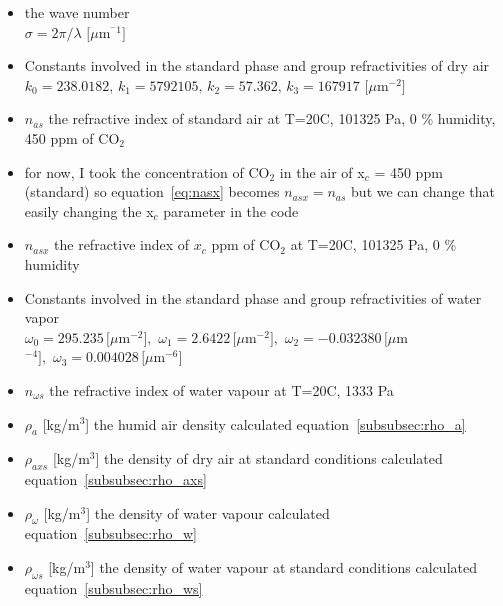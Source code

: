 \begin{itemize}
	\item the wave number\\ $\sigma  = 2\pi/\lambda\,\,[\mu $m$^{^-1}]$
	\item Constants involved in the standard phase and group refractivities of dry air \cite{Ciddor}\\ $k_0 = 238.0182,\,k_1 = 5792105,\,k_2 = 57.362,\,k_3 = 167917\,\,[\mu $m$^{-2}]$ 
	\item $n_{as}$ the refractive index of standard air at T=20\degree C, 101325 Pa, 0 \% humidity, 450 ppm of CO$_2$
	\item for now, I took the concentration of CO$_2$ in the air of x$_c$ = 450 ppm (standard) so equation~\eqref{eq:nasx} becomes $n_{asx} = n_{as}$ but we can change that easily changing the x$_c$ parameter in the code
	\item $n_{asx}$ the refractive index of $x_c$ ppm of CO$_2$ at T=20\degree C, 101325 Pa, 0 \% humidity
	\item Constants involved in the standard phase and group refractivities of water vapor\cite{Ciddor}\\ $\omega_0 = 295.235\,[\mu $m$^{-2}],\,\,\omega_1 = 2.6422\,[\mu $m$^{-2}],\,\,\omega_2 = -0.032380\,[\mu $m$^{-4}],\,\,\omega_3 = 0.004028\,[\mu$m$^{-6}]$
	\item $n_{\omega s}$ the refractive index of water vapour at T=20\degree C, 1333 Pa
	\item $\rho_a$ [kg/m$^3$] the humid air density calculated equation~\eqref{subsubsec:rho_a}
	\item $\rho_{axs}$ [kg/m$^3$] the density of dry air at standard conditions calculated equation~\eqref{subsubsec:rho_axs}
	\item $\rho_\omega$ [kg/m$^3$] the density of water vapour calculated equation~\eqref{subsubsec:rho_w}
	\item $\rho_{\omega s}$ [kg/m$^3$] the density of water vapour at standard conditions calculated equation~\eqref{subsubsec:rho_ws}
\end{itemize}


